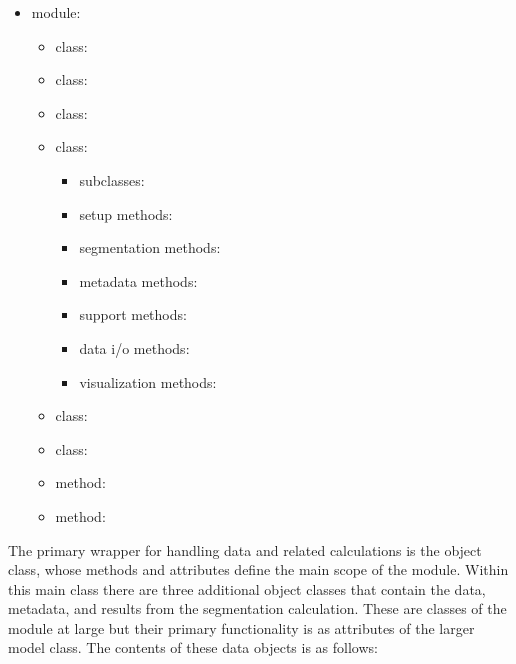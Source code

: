 \documentclass[10pt]{aastex62}
\begin{document}
\begin{itemize}
	\item{module: 
		\begin{itemize}
			\item{class: }
			\item{class: }
			\item{class: }
			\item{class:  
					\begin{itemize}
						\item{subclasses: }
						\item{setup methods: }
						\item{segmentation methods: }
						\item{metadata methods: }
						\item{support methods: }
						\item{data i/o methods: }
						\item{visualization methods: }
					\end{itemize}}
			\item{class: }
			\item{class: }
			\item{method: }
			\item{method: }
		\end{itemize}}
\end{itemize}

The primary wrapper for handling data and related calculations is the  object class, whose methods and attributes define the main scope of the module.
Within this main class there are three additional object classes that contain the data, metadata, and results from the segmentation calculation.
These are classes of the module at large but their primary functionality is as attributes of the larger model class.
The contents of these data objects is as follows:
\end{document}

